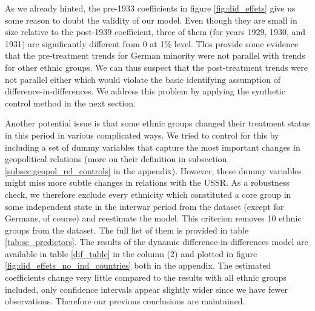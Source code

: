  
 
 
As we already hinted, the pre-1933 coefficients in figure \ref{fig:did_effets} give us some reason to doubt the
validity of our model. Even though they are small in size relative to the post-1939 coefficient,  three of them (for years 1929, 1930, and 1931) are significantly different from 0 at 1\% level.
This provide some evidence that the pre-treatment trends for German minority were not parallel with trends for other ethnic groups. We can thus suspect that the post-treatment trends were not parallel either which
would violate the basic identifying assumption of
difference-in-differences.
We address this problem by applying the synthetic control method in the next section. 
 
Another potential issue is that some ethnic groups changed their treatment status in this period in various complicated ways. 
We tried to control for this by including a set of dummy variables  that capture the most important changes in geopolitical relations (more on their definition in subsection \ref{subsec:geopol_rel_controls} in the appendix). 
However, these dummy variables might miss  more subtle changes in relations with the USSR. As a robustness check, we therefore exclude every ethnicity which constituted a core group in some independent state in the interwar period from the dataset (except for Germans, of course) and reestimate the model. This criterion removes 10 ethnic groups from the dataset. The full list of them is provided in table \ref{tab:sc_predictors}. The results of the dynamic difference-in-differences model are available in table \ref{dif_table} in the column (2) and plotted in figure \ref{fig:did_effets_no_ind_countries} both in the appendix. The estimated coefficients change  very little compared to the results with all ethnic groups included, only confidence intervals appear slightly wider since we have fewer observations. Therefore our previous conclusions are maintained. 

